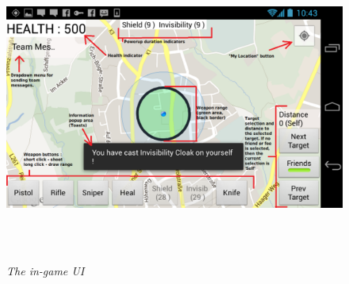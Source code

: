 \documentclass{article}
\begin{document}
\begin{figure}[ht]
\includegraphics[height=4in,width=7.12in]{./images/android_screenshots/tutorial_game.png}  
\caption{\small \sl The in-game UI \label{fig:game_ui}}
\end{figure}
\end{document}
